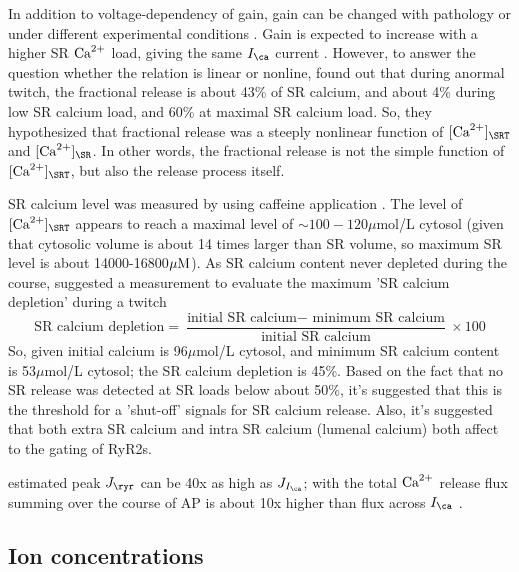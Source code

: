 In addition to voltage-dependency of gain, gain can be changed with pathology or
under different experimental conditions \citep{gomez1997,altamirano2007}. Gain
is expected to increase with a higher SR ${\text{Ca}^{2+}}$ load, giving the same $I_\ca$
current \citep{shannon2000pfs}. However, to answer the question whether the
relation is linear or nonline, \citep{shannon2000pfs} found out that during
anormal twitch, the fractional release is about 43\% of SR calcium, and about
4\% during low SR calcium load, and 60\% at maximal SR calcium load. So, they
hypothesized that fractional release was a steeply nonlinear function of
$[\Ca]_\SRT$ and $[\Ca]_\SR$. In other words, the fractional release is not the
simple function of $[\Ca]_\SRT$, but also the release process itself. 

SR calcium level was measured by using caffeine application
\citep{ginsburg1998}. The level of $[\Ca]_\SRT$ appears to reach a maximal level
of $\sim 100-120\mu$mol/L cytosol (given that cytosolic volume is about 14 times
larger than SR volume, so maximum SR level is about 14000-16800${\mu\text{M}}$).
As SR calcium content never depleted during the course, \citep{shannon2000pfs}
suggested a measurement to evaluate the maximum 'SR calcium depletion' during a
twitch
\begin{equation}
\text{SR calcium depletion} = \frac{\text{initial SR calcium} -
\text{ minimum SR calcium}}{\text{initial SR calcium}} \times 100
\end{equation}
So, given initial calcium is 96$\mu$mol/L cytosol, and minimum SR calcium
content is 53$\mu$mol/L cytosol; the SR calcium depletion is 45\%. Based on the
fact that no SR release was detected at SR loads below about 50\%, it's
suggested that this is the threshold for a 'shut-off' signals for SR calcium
release. Also, it's suggested that both extra SR calcium and intra SR calcium
(lumenal calcium) both affect to the gating of RyR2s.

\citep{cannell1994snu} estimated peak $J_\ryr$ can be 40x as high as
$J_{I_\ca}$; with the total ${\text{Ca}^{2+}}$ release flux summing over the course of AP is
about 10x higher than flux across $I_\ca$ \citep{isenberg1995, bers1991}. 

\subsection{Ion concentrations}


